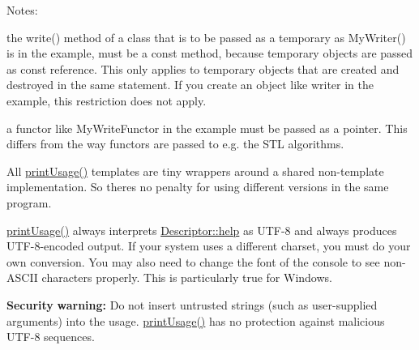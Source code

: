 \begin{DoxyParagraph}{Notes\+:}
\begin{DoxyItemize}
\item the {\ttfamily write()} method of a class that is to be passed as a temporary as {\ttfamily My\+Writer()} is in the example, must be a {\ttfamily const} method, because temporary objects are passed as const reference. This only applies to temporary objects that are created and destroyed in the same statement. If you create an object like {\ttfamily writer} in the example, this restriction does not apply. \item a functor like {\ttfamily My\+Write\+Functor} in the example must be passed as a pointer. This differs from the way functors are passed to e.\+g. the S\+TL algorithms. \item All \hyperlink{namespaceoption_afc8bb7e040a98a0b33ff1ce9da1be0d1}{print\+Usage()} templates are tiny wrappers around a shared non-\/template implementation. So there\textquotesingle{}s no penalty for using different versions in the same program. \item \hyperlink{namespaceoption_afc8bb7e040a98a0b33ff1ce9da1be0d1}{print\+Usage()} always interprets \hyperlink{structoption_1_1Descriptor_a9045b19311533e1b8a08645d57149c79}{Descriptor\+::help} as U\+T\+F-\/8 and always produces U\+T\+F-\/8-\/encoded output. If your system uses a different charset, you must do your own conversion. You may also need to change the font of the console to see non-\/\+A\+S\+C\+II characters properly. This is particularly true for Windows. \item {\bfseries Security} {\bfseries warning\+:} Do not insert untrusted strings (such as user-\/supplied arguments) into the usage. \hyperlink{namespaceoption_afc8bb7e040a98a0b33ff1ce9da1be0d1}{print\+Usage()} has no protection against malicious U\+T\+F-\/8 sequences.\end{DoxyItemize}

\end{DoxyParagraph}

